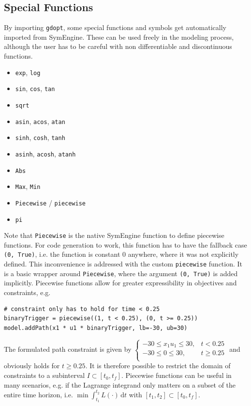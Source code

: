 \documentclass[12pt]{article}
\newcommand{\dd}{\mathrm{d}}
\begin{document}
\subsection{Special Functions}
\label{c:specialFunction}
By importing \texttt{gdopt}, some special functions and symbols
get automatically imported from SymEngine. These can be used freely in the
modeling process, although the user has to be careful with non differentiable
and discontinuous functions.
\begin{itemize}
	\item \texttt{exp}, \texttt{log}
	\item \texttt{sin}, \texttt{cos}, \texttt{tan}
	\item \texttt{sqrt}
	\item \texttt{asin}, \texttt{acos}, \texttt{atan}
	\item \texttt{sinh}, \texttt{cosh}, \texttt{tanh}
	\item \texttt{asinh}, \texttt{acosh}, \texttt{atanh}
	\item \texttt{Abs}
	\item \texttt{Max}, \texttt{Min}
	\item \texttt{Piecewise} / \texttt{piecewise}
	\item \texttt{pi}
\end{itemize}

Note that \texttt{Piecewise} is the native SymEngine function to define
piecewise functions. For code generation to work, this function has to have the
fallback
case \texttt{(0, True)}, i.e. the function is constant $0$ anywhere, where it
was not explicitly defined. This inconvenience is addressed with the custom
\texttt{piecewise} function. It is a basic wrapper around \texttt{Piecewise},
where the argument \texttt{(0, True)} is added implicitly. Piecewise functions
allow for greater expressibility in objectives and constraints, e.g.

\begin{lstlisting}
# constraint only has to hold for time < 0.25
binaryTrigger = piecewise((1, t < 0.25), (0, t >= 0.25))
model.addPath(x1 * u1 * binaryTrigger, lb=-30, ub=30) 
\end{lstlisting}

The formulated path constraint is given by
$\begin{cases}
		-30 \leq x_1  u_1 \leq 30, & t < 0.25    \\
		-30 \leq 0 \leq 30,        & t \geq 0.25 \\
	\end{cases}$
and obviously holds for $t \geq 0.25$. It is therefore possible to restrict the
domain of constraints to a subinterval $I \subset [t_0, t_f]$. Piecewise
functions can be useful in many scenarios, e.g. if the Lagrange integrand only
matters on a subset of the entire time horizon, i.e. $\min \int_{t_1}^{t_2}
	L(\cdot) \, \dd t$ with $[t_1, t_2] \subset [t_0, t_f]$.
\end{document}
